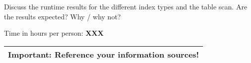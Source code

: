 \documentclass[11pt]{scrartcl}
\begin{document}
\medskip

Discuss the runtime results for the different index types and the
table scan. Are the results expected? Why / why not?


\bigskip

\noindent Time in hours per person: {\bf XXX}

\bigskip

\begin{center}
  \begin{tabular}{c}
    \hline
    {\bf Important:} Reference your information sources!
    \\\hline
  \end{tabular}
\end{center}
\end{document}
